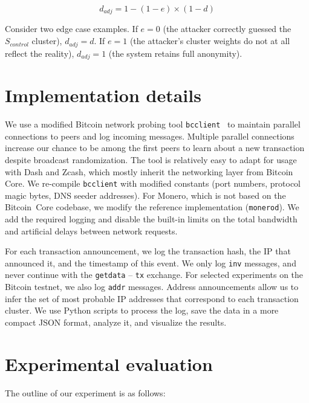 \[
d_{adj} = 1 - (1 - e) \times (1 - d)
\]

Consider two edge case examples.
If $e = 0$ (the attacker correctly guessed the~$S_{control}$ cluster), $d_{adj} = d$.
If $e = 1$ (the attacker's cluster weights do not at all reflect the reality), $d_{adj} = 1$ (the system retains full anonymity).


\section{Implementation details}

We use a modified Bitcoin network probing tool \texttt{bcclient}~\cite{Pustogarov2017} to maintain parallel connections to peers and log incoming messages.
Multiple parallel connections increase our chance to be among the first peers to learn about a new transaction despite broadcast randomization.
The tool is relatively easy to adapt for usage with Dash and Zcash, which mostly inherit the networking layer from Bitcoin Core.
We re-compile \texttt{bcclient} with modified constants (port numbers, protocol magic bytes, DNS seeder addresses).
For Monero, which is not based on the Bitcoin~Core codebase, we modify the reference implementation (\texttt{monerod}).
We add the required logging and disable the built-in limits on the total bandwidth and artificial delays between network requests.

For each transaction announcement, we log the transaction hash, the IP that announced it, and the timestamp of this event.
We only log \texttt{inv} messages, and never continue with the \texttt{getdata} -- \texttt{tx} exchange.
For selected experiments on the Bitcoin testnet, we also log \texttt{addr} messages.
Address announcements allow us to infer the set of most probable IP addresses that correspond to each transaction cluster.
We use Python scripts to process the log, save the data in a more compact JSON format, analyze it, and visualize the results.


\section{Experimental evaluation}

The outline of our experiment is as follows:

